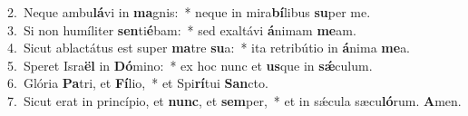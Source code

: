 {2.~}Neque ambu\textbf{lá}vi in \textbf{ma}gnis:~* neque in mira\textbf{bí}libus \textbf{su}per me.\\
{3.~}Si non humíliter \textbf{sen}ti\textbf{é}bam:~* sed exaltávi \textbf{á}nimam \textbf{me}am.\\
{4.~}Sicut ablactátus est super \textbf{ma}tre \textbf{su}a:~* ita retribútio in \textbf{á}nima \textbf{me}a.\\
{5.~}Speret Isra\textbf{ël} in \textbf{Dó}mino:~* ex hoc nunc et \textbf{us}que in \textbf{sǽ}culum.\\
{6.~}Glória \textbf{Pa}tri, et \textbf{Fí}lio,~* et Spi\textbf{rí}tui \textbf{San}cto.\\
{7.~}Sicut erat in princípio, et \textbf{nunc}, et \textbf{sem}per,~* et in sǽcula sæcu\textbf{ló}rum. \textbf{A}men.\\
